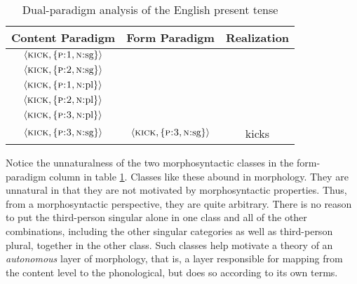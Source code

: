 \begin{table}[t]
\setlength{\extrarowheight}{6pt}
\centering
\begin{tabular}{ccc}
\toprule
Content Paradigm & Form Paradigm & Realization \\%
\midrule %
$\langle \textsc{kick}, \{ \textsc{p:1}, \textsc{n:}\text{sg} \}\rangle $ & \multirow{5}{*}{\raisebox{-32pt}{$\Bigg\langle \textsc{kick}, 
\Big\{ \big((\textsc{p:}\text{1}\vee\text{2}) \land (\textsc{n:}\text{sg} \vee \text{pl})\big) 
\vee (\textsc{p:}\text{3}\land \textsc{n:}\text{pl}) \Big\} \Bigg\rangle$}} 
& \multirow{5}{*}{\raisebox{-20pt}{kick}} \\ \cmidrule{1-1}
$\langle \textsc{kick},\{\textsc{p:2}, \textsc{n:}\text{sg}\}\rangle$  &\\ \cmidrule{1-1}
$\langle \textsc{kick}, \{\textsc{p:1}, \textsc{n:}\text{pl}\}\rangle$  & \\ \cmidrule{1-1}
$\langle \textsc{kick}, \{\textsc{p:2}, \textsc{n:}\text{pl}\}\rangle$ &  \\ \cmidrule{1-1}
$\langle \textsc{kick}, \{\textsc{p:3}, \textsc{n:}\text{pl}\}\rangle$ & \\ \midrule
$\langle \textsc{kick}, \{\textsc{p:3}, \textsc{n:}\text{sg}\} \rangle$ & $\langle\textsc{kick}, \{\textsc{p:3}, \textsc{n:}\text{sg}\}\rangle$  & kicks \\
\bottomrule
\end{tabular}
\caption{Dual-paradigm analysis of the English present tense}
\label{tab:engverbpres}
\end{table}

Notice the unnaturalness of the two morphosyntactic classes in
the form-paradigm column in table \ref{tab:engverbpres}.
Classes like these abound in morphology.  
They are unnatural in that they are not motivated by morphosyntactic properties. Thus, from a morphosyntactic
perspective, they are quite arbitrary.
There is no reason to put the third-person singular alone in one class and all of the other combinations, 
including the other singular categories as well as third-person plural, together in the other class. Such classes help motivate 
a theory of an \emph{autonomous} layer of morphology, that is, a layer responsible 
for mapping from the content level to the phonological, but does so according 
to its own terms.

